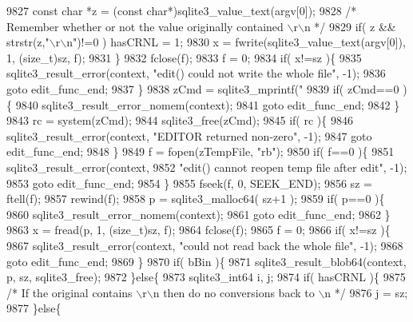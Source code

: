 \begin{DoxyCode}
{9827     \textcolor{keyword}{const} \textcolor{keywordtype}{char} *z = (\textcolor{keyword}{const} \textcolor{keywordtype}{char}*)sqlite3_value_text(argv[0]);
9828     \textcolor{comment}{/* Remember whether or not the value originally contained \(\backslash\)r\(\backslash\)n */}
9829     \textcolor{keywordflow}{if}( z && strstr(z,\textcolor{stringliteral}{"\(\backslash\)r\(\backslash\)n"})!=0 ) hasCRNL = 1;
9830     x = fwrite(sqlite3_value_text(argv[0]), 1, (\textcolor{keywordtype}{size\_t})sz, f);
9831   \}
9832   fclose(f);
9833   f = 0;
9834   \textcolor{keywordflow}{if}( x!=sz )\{
9835     sqlite3_result_error(context, \textcolor{stringliteral}{"edit() could not write the whole file"}, -1);
9836     \textcolor{keywordflow}{goto} edit\_func\_end;
9837   \}
9838   zCmd = sqlite3_mprintf(\textcolor{stringliteral}{"%
9839   \textcolor{keywordflow}{if}( zCmd==0 )\{
9840     sqlite3_result_error_nomem(context);
9841     \textcolor{keywordflow}{goto} edit\_func\_end;
9842   \}
9843   rc = system(zCmd);
9844   sqlite3_free(zCmd);
9845   \textcolor{keywordflow}{if}( rc )\{
9846     sqlite3_result_error(context, \textcolor{stringliteral}{"EDITOR returned non-zero"}, -1);
9847     \textcolor{keywordflow}{goto} edit\_func\_end;
9848   \}
9849   f = fopen(zTempFile, \textcolor{stringliteral}{"rb"});
9850   \textcolor{keywordflow}{if}( f==0 )\{
9851     sqlite3_result_error(context,
9852       \textcolor{stringliteral}{"edit() cannot reopen temp file after edit"}, -1);
9853     \textcolor{keywordflow}{goto} edit\_func\_end;
9854   \}
9855   fseek(f, 0, SEEK\_END);
9856   sz = ftell(f);
9857   rewind(f);
9858   p = sqlite3_malloc64( sz+1 );
9859   \textcolor{keywordflow}{if}( p==0 )\{
9860     sqlite3_result_error_nomem(context);
9861     \textcolor{keywordflow}{goto} edit\_func\_end;
9862   \}
9863   x = fread(p, 1, (\textcolor{keywordtype}{size\_t})sz, f);
9864   fclose(f);
9865   f = 0;
9866   \textcolor{keywordflow}{if}( x!=sz )\{
9867     sqlite3_result_error(context, \textcolor{stringliteral}{"could not read back the whole file"}, -1);
9868     \textcolor{keywordflow}{goto} edit\_func\_end;
9869   \}
9870   \textcolor{keywordflow}{if}( bBin )\{
9871     sqlite3_result_blob64(context, p, sz, sqlite3_free);
9872   \}\textcolor{keywordflow}{else}\{
9873     sqlite3_int64 i, j;
9874     \textcolor{keywordflow}{if}( hasCRNL )\{
9875       \textcolor{comment}{/* If the original contains \(\backslash\)r\(\backslash\)n then do no conversions back to \(\backslash\)n */}
9876       j = sz;
9877     \}\textcolor{keywordflow}{else}\{
}}
\end{DoxyCode}

